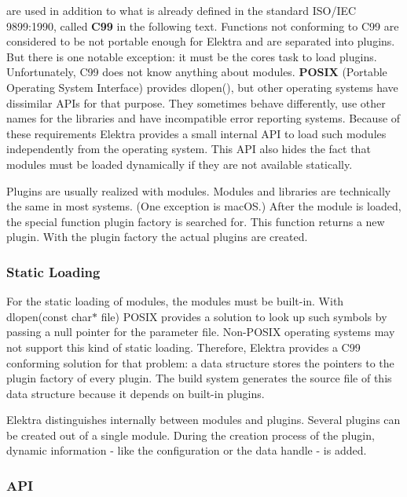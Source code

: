 are used in addition to what is already defined in the standard I\+S\+O/\+I\+EC 9899\+:1990, called {\bfseries C99} in the following text. Functions not conforming to C99 are considered to be not portable enough for Elektra and are separated into plugins. But there is one notable exception\+: it must be the core\textquotesingle{}s task to load plugins. Unfortunately, C99 does not know anything about modules. {\bfseries P\+O\+S\+IX} (Portable Operating System Interface) provides {\ttfamily dlopen()}, but other operating systems have dissimilar A\+P\+Is for that purpose. They sometimes behave differently, use other names for the libraries and have incompatible error reporting systems. Because of these requirements Elektra provides a small internal A\+PI to load such modules independently from the operating system. This A\+PI also hides the fact that modules must be loaded dynamically if they are not available statically.

Plugins are usually realized with modules. Modules and libraries are technically the same in most systems. (One exception is mac\+OS.) After the module is loaded, the special function plugin factory is searched for. This function returns a new plugin. With the plugin factory the actual plugins are created.

\subsubsection*{Static Loading}

For the static loading of modules, the modules must be built-\/in. With {\ttfamily dlopen(const char$\ast$ file)} P\+O\+S\+IX provides a solution to look up such symbols by passing a null pointer for the parameter {\ttfamily file}. Non-\/\+P\+O\+S\+IX operating systems may not support this kind of static loading. Therefore, Elektra provides a C99 conforming solution for that problem\+: a data structure stores the pointers to the plugin factory of every plugin. The build system generates the source file of this data structure because it depends on built-\/in plugins.

Elektra distinguishes internally between modules and plugins. Several plugins can be created out of a single module. During the creation process of the plugin, dynamic information -\/ like the configuration or the data handle -\/ is added.

\subsubsection*{A\+PI}

